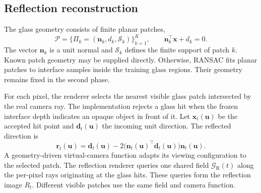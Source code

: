 \subsection{Reflection reconstruction}
The glass geometry consists of finite planar patches,
\begin{equation}
  \mathcal{P}=\{\Pi_k=(\mathbf{n}_k,d_k,\mathcal{S}_k)\}_{k=1}^{K},
  \qquad \mathbf{n}_k^{\top}\mathbf{x}+d_k=0.
  \label{eq:glass-patches}
\end{equation}
The vector $\mathbf{n}_k$ is a unit normal and $\mathcal{S}_k$ defines the finite support of patch $k$. Known patch geometry may be supplied directly. Otherwise, RANSAC fits planar patches to interface samples inside the training glass regions. Their geometry remains fixed in the second phase.

For each pixel, the renderer selects the nearest visible glass patch intersected by the real camera ray. The implementation rejects a glass hit when the frozen interface depth indicates an opaque object in front of it. Let $\mathbf{x}_t(\mathbf{u})$ be the accepted hit point and $\mathbf{d}_t(\mathbf{u})$ the incoming unit direction. The reflected direction is
\begin{equation}
  \mathbf{r}_t(\mathbf{u})
    = \mathbf{d}_t(\mathbf{u})
      - 2\bigl(\mathbf{n}_t(\mathbf{u})^{\top}\mathbf{d}_t(\mathbf{u})\bigr)
        \mathbf{n}_t(\mathbf{u}).
  \label{eq:reflection-direction}
\end{equation}
A geometry-driven virtual-camera function adapts its viewing configuration to the selected patch. The reflection renderer queries one shared field $\mathcal{G}_{\mathrm{R}}(t)$ along the per-pixel rays originating at the glass hits. These queries form the reflection image $R_t$. Different visible patches use the same field and camera function.

